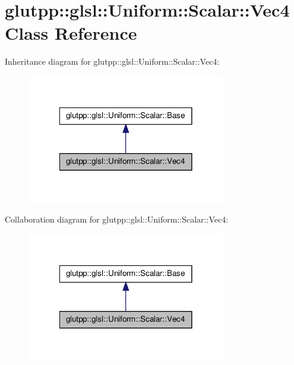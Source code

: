 \hypertarget{classglutpp_1_1glsl_1_1Uniform_1_1Scalar_1_1Vec4}{\section{glutpp\-:\-:glsl\-:\-:\-Uniform\-:\-:\-Scalar\-:\-:\-Vec4 \-Class \-Reference}
\label{classglutpp_1_1glsl_1_1Uniform_1_1Scalar_1_1Vec4}
}


\-Inheritance diagram for glutpp\-:\-:glsl\-:\-:\-Uniform\-:\-:\-Scalar\-:\-:\-Vec4\-:\nopagebreak
\begin{figure}[H]
\begin{center}
\leavevmode
\includegraphics[width=246pt]{classglutpp_1_1glsl_1_1Uniform_1_1Scalar_1_1Vec4__inherit__graph}
\end{center}
\end{figure}


\-Collaboration diagram for glutpp\-:\-:glsl\-:\-:\-Uniform\-:\-:\-Scalar\-:\-:\-Vec4\-:\nopagebreak
\begin{figure}[H]
\begin{center}
\leavevmode
\includegraphics[width=246pt]{classglutpp_1_1glsl_1_1Uniform_1_1Scalar_1_1Vec4__coll__graph}
\end{center}
\end{figure}

